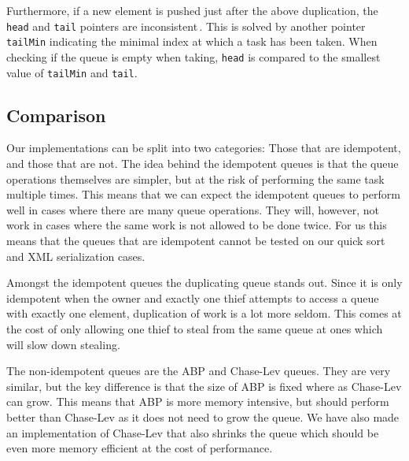 Furthermore, if a new element is pushed just after the above duplication, the \texttt{head} and \texttt{tail} pointers are inconsistent\,\cite[p. 235]{Leijen:2009:DTP:1639949.1640106}. This is solved by another pointer \texttt{tailMin} indicating the minimal index at which a task has been taken. When checking if the queue is empty when taking, \texttt{head} is compared to the smallest value of \texttt{tailMin} and \texttt{tail}.

\subsection{Comparison}
Our implementations can be split into two categories: Those that are idempotent, and those that are not. The idea behind the idempotent queues is that the queue operations themselves are simpler, but at the risk of performing the same task multiple times. This means that we can expect the idempotent queues to perform well in cases where there are many queue operations. They will, however, not work in cases where the same work is not allowed to be done twice. For us this means that the queues that are idempotent cannot be tested on our quick sort and XML serialization cases.

Amongst the idempotent queues the duplicating queue stands out. Since it is only idempotent when the owner and exactly one thief attempts to access a queue with exactly one element, duplication of work is a lot more seldom. This comes at the cost of only allowing one thief to steal from the same queue at ones which will slow down stealing.

The non-idempotent queues are the ABP and Chase-Lev queues. They are very similar, but the key difference is that the size of ABP is fixed where as Chase-Lev can grow. This means that ABP is more memory intensive, but should perform better than Chase-Lev as it does not need to grow the queue. We have also made an implementation of Chase-Lev that also shrinks the queue which should be even more memory efficient at the cost of performance.
